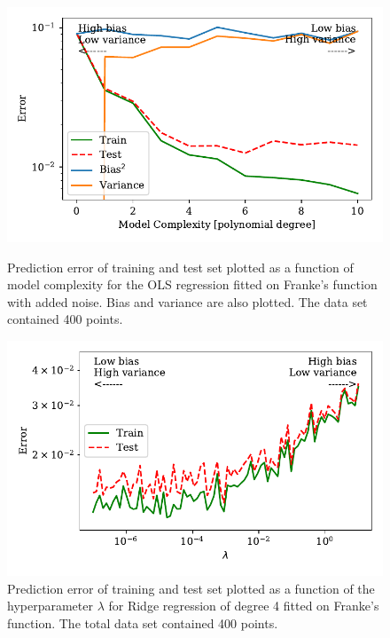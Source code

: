 \documentclass[a4paper, 10pt]{article}
\begin{document}
\begin{multicols}{2}
\end{multicols}



\begin{figure}[H]
    \includegraphics[scale=1]{figs/biasvariancetradeoff_ols_Franke.pdf}
    \caption{Prediction error of training and test set plotted as a function of model complexity for the OLS regression fitted on Franke's function with added noise. Bias and variance are also plotted. The data set contained 400 points.}
    \label{fig:bias_ols_Franke}

    \includegraphics{figs/biasvariancetradeoff_Ridge_Franke.pdf}
    \caption{Prediction error of training and test set plotted as a function of the hyperparameter $\lambda$ for Ridge regression of degree 4 fitted on Franke's function. The total data set contained 400 points.}
    \label{fig:bias_ridge_Franke}
\end{figure}
\end{document}
